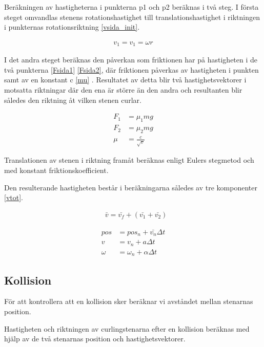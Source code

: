 \documentclass[11pt]{article} %
\begin{document}
Beräkningen av hastigheterna i punkterna p1 och p2 beräknas i två steg. I första steget omvandlas stenens rotationshastighet till translationshastighet i riktningen i punkternas rotationsriktning \eqref{vsida_init}. 
 
\begin{align}\label{vsida_init}
 v_1 = v_1 = \omega r
 \end{align}

I det andra steget beräknas den påverkan som friktionen har på hastigheten i de två punkterna \eqref{Fsida1} \eqref{Fsida2}, där friktionen påverkas av hastigheten i punkten samt av en konstant c \eqref{mu} . 
Resultatet av detta blir två hastighetsvektorer i motsatta riktningar där den ena är större än den andra och resultanten blir således den riktning åt vilken stenen curlar. 

 \begin{align}\label{Fsida1}
 F_1& = \mu_1 mg\\\label{Fsida2}
F_2& = \mu_2 mg\\\label{mu}
\mu&=\frac{c}{\sqrt{v}}
 \end{align}

Translationen av stenen i riktning framåt beräknas enligt Eulers stegmetod och med konstant friktionskoefficient. 

Den resulterande hastigheten består i beräkningarna således av tre komponenter  \eqref{vtot}. 

 \begin{align}\label{vtot}
 &\bar{v}=\bar{v_f}+(\bar{v_1}+\bar{v_2})
 \end{align}




 \begin{align} %
 pos&=pos_n+\bar{v_n}\Delta t \\  %
 v&=v_n+a \Delta t \\ 
 \omega&=\omega_n+\alpha \Delta t  
 \end{align}

\subsection{Kollision}

För att kontrollera att en kollision sker beräknar vi avståndet mellan stenarnas position.

Hastigheten och riktningen av curlingstenarna efter en kollision beräknas med hjälp av de två stenarnas position och hastighetsvektorer. 
\end{document}
